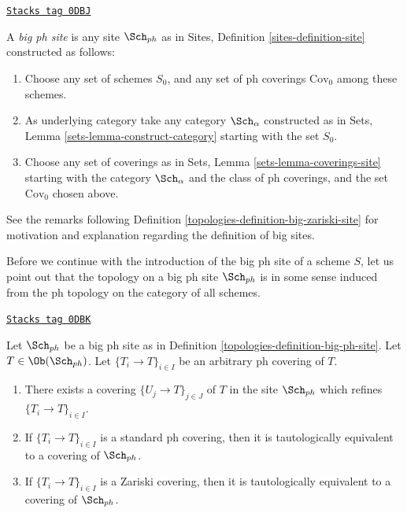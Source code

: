 \begin{definition}
\label{topologies-definition-big-ph-site}
\href{https://stacks.math.columbia.edu/tag/0DBJ}{\texttt{Stacks tag 0DBJ}}

A {\it big ph site} is any site $\Sch_{ph}$ as in
Sites, Definition \ref{sites-definition-site} constructed as follows:
\begin{enumerate}
\item Choose any set of schemes $S_0$, and any set of ph coverings
$\text{Cov}_0$ among these schemes.
\item As underlying category take any category $\Sch_\alpha$
constructed as in Sets, Lemma \ref{sets-lemma-construct-category}
starting with the set $S_0$.
\item Choose any set of coverings as in
Sets, Lemma \ref{sets-lemma-coverings-site} starting with the
category $\Sch_\alpha$ and the class of ph coverings,
and the set $\text{Cov}_0$ chosen above.
\end{enumerate}
\end{definition}

See the remarks following Definition \ref{topologies-definition-big-zariski-site}
for motivation and explanation regarding the definition of big sites.

\medskip\noindent
Before we continue with the introduction of the big ph site of
a scheme $S$, let us point out that the topology on a big ph site
$\Sch_{ph}$ is in some sense induced from the ph topology
on the category of all schemes.

\begin{lemma}[Ph induced]
\label{topologies-lemma-ph-induced}
\href{https://stacks.math.columbia.edu/tag/0DBK}{\texttt{Stacks tag 0DBK}}

Let $\Sch_{ph}$ be a big ph site as in
Definition \ref{topologies-definition-big-ph-site}.
Let $T \in \Ob(\Sch_{ph})$.
Let $\{T_i \to T\}_{i \in I}$ be an arbitrary ph covering of $T$.
\begin{enumerate}
\item There exists a covering $\{U_j \to T\}_{j \in J}$ of $T$ in the site
$\Sch_{ph}$ which refines $\{T_i \to T\}_{i \in I}$.
\item If $\{T_i \to T\}_{i \in I}$ is a standard ph covering, then
it is tautologically equivalent to a covering of $\Sch_{ph}$.
\item If $\{T_i \to T\}_{i \in I}$ is a Zariski covering, then
it is tautologically equivalent to a covering of $\Sch_{ph}$.
\end{enumerate}
\end{lemma}

